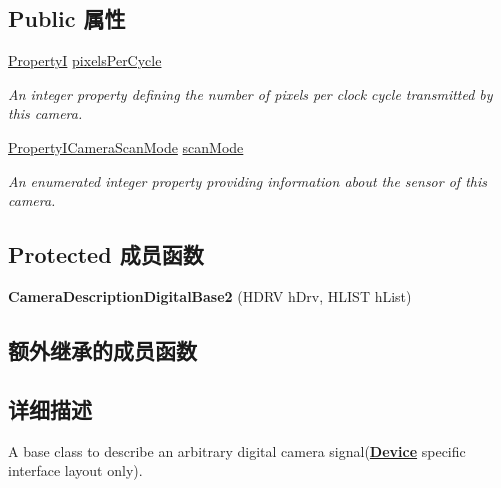 \subsection*{Public 属性}
\begin{DoxyCompactItemize}
\item 
\hyperlink{group___common_interface_ga12d5e434238ca242a1ba4c6c3ea45780}{Property\+I} \hyperlink{classmv_i_m_p_a_c_t_1_1acquire_1_1_camera_description_digital_base2_aeb16b4df160c9f47b833e4264ff09602}{pixels\+Per\+Cycle}
\begin{DoxyCompactList}\small\item\em An integer property defining the number of pixels per clock cycle transmitted by this camera. \end{DoxyCompactList}\item 
\hyperlink{group___device_specific_interface_ga762c072be6a70ec34c79682ae145f677}{Property\+I\+Camera\+Scan\+Mode} \hyperlink{classmv_i_m_p_a_c_t_1_1acquire_1_1_camera_description_digital_base2_a4b1e7be4e83a56bfaf23a298f47029de}{scan\+Mode}
\begin{DoxyCompactList}\small\item\em An enumerated integer property providing information about the sensor of this camera. \end{DoxyCompactList}\end{DoxyCompactItemize}
\subsection*{Protected 成员函数}
\begin{DoxyCompactItemize}
\item 
\hypertarget{classmv_i_m_p_a_c_t_1_1acquire_1_1_camera_description_digital_base2_ad8a96f1c7443cdc81d3ddb1d3e6335f6}{{\bfseries Camera\+Description\+Digital\+Base2} (H\+D\+R\+V h\+Drv, H\+L\+I\+S\+T h\+List)}\label{classmv_i_m_p_a_c_t_1_1acquire_1_1_camera_description_digital_base2_ad8a96f1c7443cdc81d3ddb1d3e6335f6}

\end{DoxyCompactItemize}
\subsection*{额外继承的成员函数}


\subsection{详细描述}
A base class to describe an arbitrary digital camera signal({\bfseries \hyperlink{classmv_i_m_p_a_c_t_1_1acquire_1_1_device}{Device}} specific interface layout only). 

